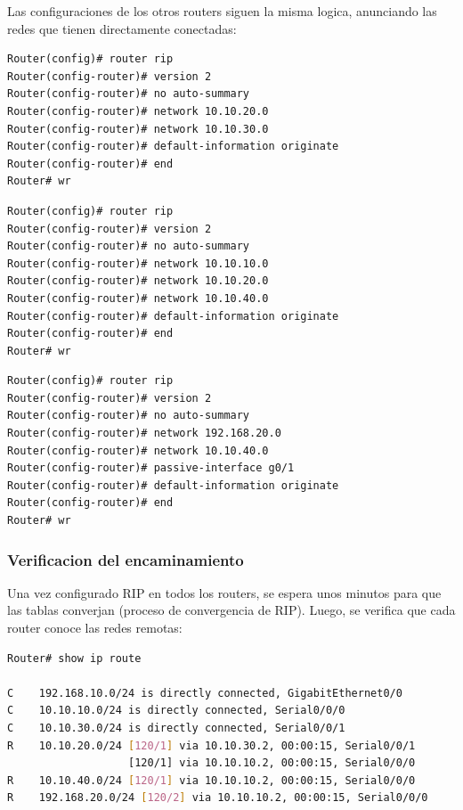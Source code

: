 Las configuraciones de los otros routers siguen la misma logica, anunciando las
redes que tienen directamente conectadas:

\begin{lstlisting}[caption={Configuracion de RIP en Router 1},label={lst:router1-rip}]
Router(config)# router rip
Router(config-router)# version 2
Router(config-router)# no auto-summary
Router(config-router)# network 10.10.20.0
Router(config-router)# network 10.10.30.0
Router(config-router)# default-information originate
Router(config-router)# end
Router# wr
\end{lstlisting}

\begin{lstlisting}[caption={Configuracion de RIP en Router 2},label={lst:router2-rip}]
Router(config)# router rip
Router(config-router)# version 2
Router(config-router)# no auto-summary
Router(config-router)# network 10.10.10.0
Router(config-router)# network 10.10.20.0
Router(config-router)# network 10.10.40.0
Router(config-router)# default-information originate
Router(config-router)# end
Router# wr
\end{lstlisting}

\begin{lstlisting}[caption={Configuracion de RIP en Router 3},label={lst:router3-rip}]
Router(config)# router rip
Router(config-router)# version 2
Router(config-router)# no auto-summary
Router(config-router)# network 192.168.20.0
Router(config-router)# network 10.10.40.0
Router(config-router)# passive-interface g0/1
Router(config-router)# default-information originate
Router(config-router)# end
Router# wr
\end{lstlisting}

\subsubsection{Verificacion del encaminamiento}

Una vez configurado RIP en todos los routers, se espera unos minutos para que
las tablas converjan (proceso de convergencia de RIP). Luego, se verifica que
cada router conoce las redes remotas:

\begin{lstlisting}[language=bash,caption={Verificacion de la tabla de encaminamiento en Router 0},label={lst:show-ip-route}]
Router# show ip route

C    192.168.10.0/24 is directly connected, GigabitEthernet0/0
C    10.10.10.0/24 is directly connected, Serial0/0/0
C    10.10.30.0/24 is directly connected, Serial0/0/1
R    10.10.20.0/24 [120/1] via 10.10.30.2, 00:00:15, Serial0/0/1
                   [120/1] via 10.10.10.2, 00:00:15, Serial0/0/0
R    10.10.40.0/24 [120/1] via 10.10.10.2, 00:00:15, Serial0/0/0
R    192.168.20.0/24 [120/2] via 10.10.10.2, 00:00:15, Serial0/0/0
\end{lstlisting}

